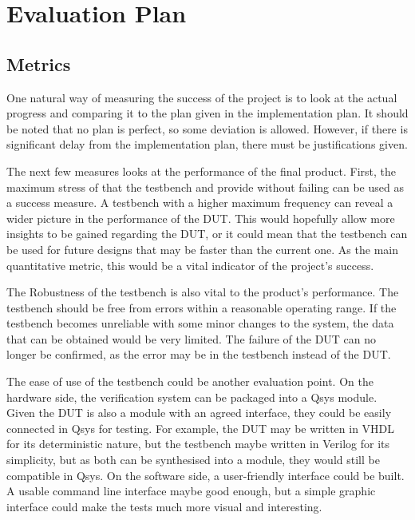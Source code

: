 \section{Evaluation Plan}

\subsection{Metrics}
One natural way of measuring the success of the project is to look at the actual
progress and comparing it to the plan given in the implementation plan.
It should be noted that no plan is perfect, so some deviation is allowed.
However, if there is significant delay from the implementation plan, there must
be justifications given.

The next few measures looks at the performance of the final product.
First, the maximum stress of that the testbench and provide without failing can
be used as a success measure.
A testbench with a higher maximum frequency can reveal a wider picture in the
performance of the DUT.
This would hopefully allow more insights to be gained regarding the DUT, or
it could mean that the testbench can be used for future designs that may be
faster than the current one.
As the main quantitative metric, this would be a vital indicator of the
project's success.

The Robustness of the testbench is also vital to the product's performance.
The testbench should be free from errors within a reasonable operating range.
If the testbench becomes unreliable with some minor changes to the system,
the data that can be obtained would be very limited.
The failure of the DUT can no longer be confirmed, as the error may be in the
testbench instead of the DUT.

The ease of use of the testbench could be another evaluation point.
On the hardware side, the verification system can be packaged into a Qsys
module.
Given the DUT is also a module with an agreed interface, they could be easily
connected in Qsys for testing.
For example, the DUT may be written in VHDL for its deterministic nature, but
the testbench maybe written in Verilog for its simplicity, but as both can be
synthesised into a module, they would still be compatible in Qsys.
On the software side, a user-friendly interface could be built.
A usable command line interface maybe good enough, but a simple graphic
interface could make the tests much more visual and interesting.

